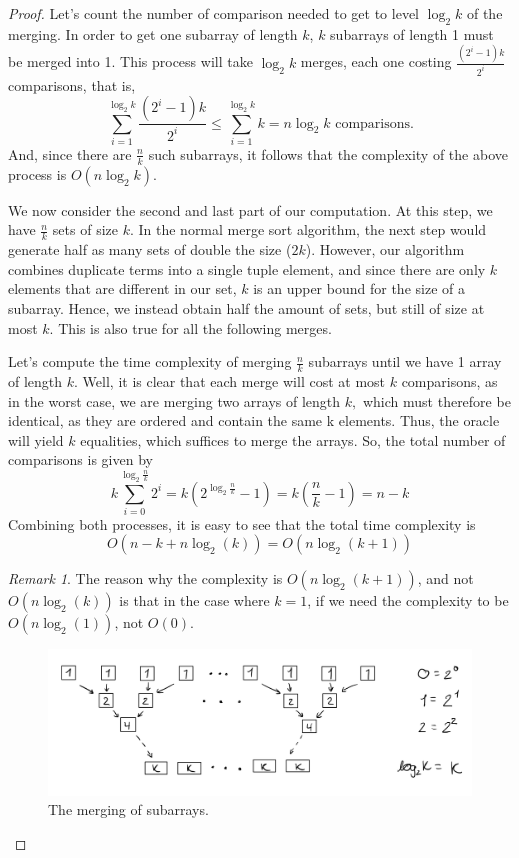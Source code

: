 \documentclass[12pt]{article}
\theoremstyle{definition}
\theoremstyle{remark}
\newtheorem*{remark}{Remark}
\begin{document}
\begin{enumerate}
\begin{enumerate}
\begin{proof}
     \hspace{24pt} Let's count the number of comparison needed to get to level $\log_2k$ of the merging. In order to get one subarray of length $k$, $k$ subarrays of length 1 must be merged into 1. This process will take $\log_2 k$ merges, each one costing $\frac{(2^i-1)k}{2^i}$ comparisons, that is, 
     $$\sum^{\log_2 k}_{i=1} \frac{(2^i-1)k}{2^i} \leq \sum^{\log_2k}_{i=1} k = n \log_2 k \text{  comparisons.} $$
     And, since there are $\frac{n}{k}$ such subarrays, it follows that the complexity of the above process is $O(n \log_2 k).$ 
  

     \hspace{24pt} We now consider the second and last part of our computation. At this step, we have $\frac{n}{k}$ sets of size $k$. In the normal merge sort algorithm, the next step would generate half as many sets of double the size ($2k$). However, our algorithm combines duplicate terms into a single tuple element, and since there are only $k$ elements that are different in our set, $k$ is an upper bound for the size of a subarray. Hence, we instead obtain half the amount of sets, but still of size at most $k$. This is also true for all the following merges. 

    
     \hspace{24pt} Let's compute the time complexity of merging $\frac{n}{k}$ subarrays until we have 1 array of length $k.$ Well, it is clear that each merge will cost at most $k$ comparisons, as in the worst case, we are merging two arrays of length $k,$ which must therefore be identical, as they are ordered and contain the same k elements. Thus, the oracle will yield $k$ equalities, which suffices to merge the arrays. So, the total number of comparisons is given by 
     $$k \sum^{\log_2 \frac{n}{k}}_{i=0}  2^i = k (2^{\log_2 \frac{n}{k} }-1) = k \left( \frac{n}{k} -1 \right) = n-k  $$
     Combining both processes, it is easy to see that the total time complexity is 
     $$O(n-k + n \log_2 (k) ) = O(n \log_2 (k + 1)) $$
\begin{remark} 
  The reason why the complexity is $O(n\log_2(k+1))$, and not $O(n\log_2(k))$ is that in the case where $k = 1$, if we need the complexity to be $O(n \log_2 (1))$, not $O(0)$. 
\end{remark}
\begin{figure}
    \centering
    \includegraphics[scale=0.20]{IMG_1052.jpg}
    \caption{The merging of subarrays.}
    \label{fig1}
\end{figure}
   \end{proof}


\end{enumerate}
\end{enumerate}
\end{document}
